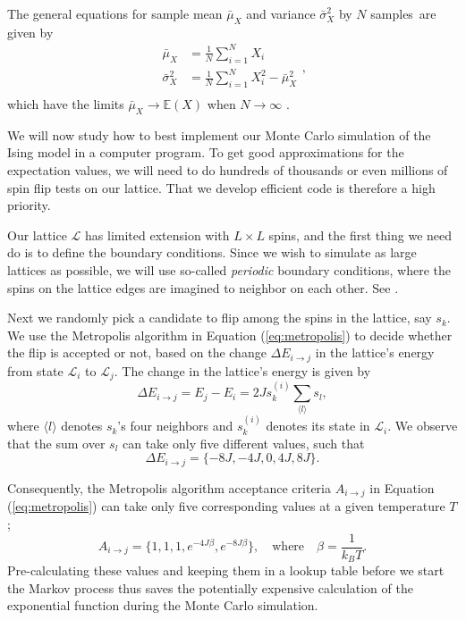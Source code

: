 \documentclass[]{article}
\begin{document}
The general equations for sample mean $\bar{\mu}_X$ and variance $\bar{\sigma}^2_X$ by $N$ samples are given by
\begin{equation}
\begin{aligned}
	\bar{\mu}_X &= \frac{1}{N} \sum_{i=1}^{N} X_i \\
	\bar{\sigma}^2_X &= \frac{1}{N} \sum_{i=1}^{N} X^2_i - \bar{\mu}^2_X \\
\end{aligned},
\end{equation}
which have the limits $\bar{\mu}_X \rightarrow \mathbb{E}(X)$ when $N \rightarrow \infty$ \cite{fys-stk4155-notes}.

\vspace{5mm}

We will now study how to best implement our Monte Carlo simulation of the Ising model in a computer program. To get good approximations for the expectation values, we will need to do hundreds of thousands or even millions of spin flip tests on our lattice. That we develop efficient code is therefore a high priority.

Our lattice $\mathcal{L}$ has limited extension with $L \times L$ spins, and the first thing we need do is to define the boundary conditions. Since we wish to simulate as large lattices as possible, we will use so-called \textit{periodic} boundary conditions, where the spins on the lattice edges are imagined to neighbor on each other. See \cite{fys4150-notes}.

Next we randomly pick a candidate to flip among the spins in the lattice, say $s_k$. We use the Metropolis algorithm in Equation (\ref{eq:metropolis}) to decide whether the flip is accepted or not, based on the change $\Delta E_{i \rightarrow j}$ in the lattice's energy from state $\mathcal{L}_i$ to $\mathcal{L}_j$. The change in the lattice's energy is given by
\begin{equation} \label{eq:dE}
	\Delta E_{i \rightarrow j} = E_j - E_i = 2J s_k^{(i)} \sum_{\langle l \rangle} s_l,
\end{equation}
where $\langle l \rangle$ denotes $s_k$'s four neighbors and $s_k^{(i)}$ denotes its state in $\mathcal{L}_i$. We observe that the sum over $s_l$ can take only five different values, such that
\begin{equation}
	\Delta E_{i \rightarrow j} = \{-8J, -4J, 0, 4J, 8J \}.
\end{equation}

Consequently, the Metropolis algorithm acceptance criteria $A_{i \rightarrow j}$ in Equation (\ref{eq:metropolis}) can take only five corresponding values at a given temperature $T$;
\begin{equation} \label{eq:metropolis-acceptance}
	A_{i \rightarrow j} = \{ 1, 1, 1, e^{-4J \beta}, e^{-8J \beta} \}, \quad \text{where} \quad \beta = \frac{1}{k_BT}.
\end{equation}
Pre-calculating these values and keeping them in a lookup table before we start the Markov process thus saves the potentially expensive calculation of the exponential function during the Monte Carlo simulation.
\end{document}
